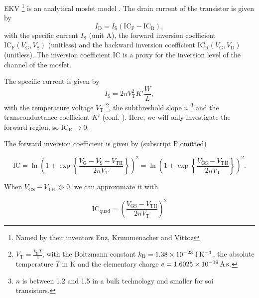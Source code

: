 \documentclass{article}[11pt]
\begin{document}
\notetitle

EKV%
\footnote{Named by their inventors Enz, Krummenacher and Vittoz}
is an analytical \gls{mosfet} model \cite{enz-ekv-95,enz-ekvstory-08}.
The drain current of the transistor is given by
\begin{equation}
I_{\mathrm{D}} = I_{\mathrm{S}} \left(\mathrm{IC}_{\mathrm{F}}-\mathrm{IC}_{\mathrm{R}}\right),
\end{equation}
with the specific current $I_{\mathrm{S}}$ (unit A), the forward 
inversion coefficient 
$\mathrm{IC}_{\mathrm{F}}(V_{\mathrm{G}}, V_{\mathrm{S}})$ (unitless) and 
the backward inversion coefficient 
$\mathrm{IC}_{\mathrm{R}}(V_{\mathrm{G}}, V_{\mathrm{D}})$ (unitless).
The inversion coefficient $\mathrm{IC}$ is a proxy for the inversion level of 
the channel of the \gls{mosfet}.

\medskip

The specific current is given by
\begin{equation}
  I_{\mathrm{S}} = 2 n V_{\mathrm{T}}^2 K' \frac{W}{L},
\end{equation}
with the temperature voltage $V_{\mathrm{T}}$%
\footnote{$V_{\mathrm{T}}=\frac{k_{\mathrm{B}} T }{e}$, with the 
Boltzmann constant $k_{\mathrm{B}}=\SI{1.38d-23}{\joule\per\kelvin}$, 
the absolute temperature $T$ in \si{\kelvin} and the 
elementary charge $e=\SI{1.6025d-19}{\ampere\second}$.},
the subthreshold slope $n$%
\footnote{$n$ is between 1.2 and 1.5 in a bulk technology and smaller 
for \gls{soi} transistors\cite{jespers-gmid-17}.}
 and the transconductance coefficient $K'$ 
(conf. \cite{mosfet-square-law}).
Here, we will only investigate the forward region, so 
$\mathrm{IC}_{\mathrm{R}} \rightarrow 0$.

\bigskip

The forward inversion coefficient is given by 
(subscript $\mathrm{F}$ omitted)

\begin{equation}\label{eq:ic}
  \mathrm{IC} = \ln\left(1+\exp\left\{\frac{V_{\mathrm{G}}-V_{\mathrm{S}}-V_{\mathrm{TH}}}{2 n V_{\mathrm{T}}}\right\}\right)^2
              = \ln\left(1+\exp\left\{\frac{V_{\mathrm{GS}}-V_{\mathrm{TH}}}{2 n V_{\mathrm{T}}}\right\}\right)^2.
\end{equation}


When $V_{\mathrm{GS}}-V_{\mathrm{TH}} \gg 0$, we can approximate 
it with

\begin{equation}\label{eq:ic-quad}
  \mathrm{IC}_{\mathrm{quad}} = \left(\frac{V_{\mathrm{GS}}-V_{\mathrm{TH}}}{2 n V_{\mathrm{T}}}\right)^2
\end{equation}
\end{document}
